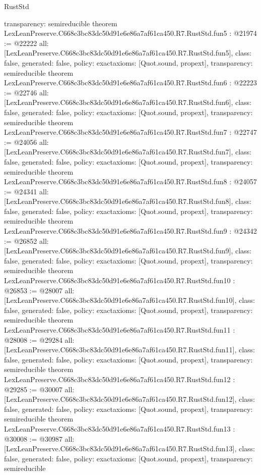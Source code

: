 \begin{lexlean}{RustStd}
\begin{coremodule}
{  transparency: semireducible
}
theorem LexLeanPreserve.C668c3bc83dc50d91e6e86a7af61ca450.R7.RustStd.fun5 : @21974 := @22222 {
  all: [LexLeanPreserve.C668c3bc83dc50d91e6e86a7af61ca450.R7.RustStd.fun5],
  class: false,
  generated: false,
  policy: exact{axioms: [Quot.sound, propext]},
  transparency: semireducible
}
theorem LexLeanPreserve.C668c3bc83dc50d91e6e86a7af61ca450.R7.RustStd.fun6 : @22223 := @22746 {
  all: [LexLeanPreserve.C668c3bc83dc50d91e6e86a7af61ca450.R7.RustStd.fun6],
  class: false,
  generated: false,
  policy: exact{axioms: [Quot.sound, propext]},
  transparency: semireducible
}
theorem LexLeanPreserve.C668c3bc83dc50d91e6e86a7af61ca450.R7.RustStd.fun7 : @22747 := @24056 {
  all: [LexLeanPreserve.C668c3bc83dc50d91e6e86a7af61ca450.R7.RustStd.fun7],
  class: false,
  generated: false,
  policy: exact{axioms: [Quot.sound, propext]},
  transparency: semireducible
}
theorem LexLeanPreserve.C668c3bc83dc50d91e6e86a7af61ca450.R7.RustStd.fun8 : @24057 := @24341 {
  all: [LexLeanPreserve.C668c3bc83dc50d91e6e86a7af61ca450.R7.RustStd.fun8],
  class: false,
  generated: false,
  policy: exact{axioms: [Quot.sound, propext]},
  transparency: semireducible
}
theorem LexLeanPreserve.C668c3bc83dc50d91e6e86a7af61ca450.R7.RustStd.fun9 : @24342 := @26852 {
  all: [LexLeanPreserve.C668c3bc83dc50d91e6e86a7af61ca450.R7.RustStd.fun9],
  class: false,
  generated: false,
  policy: exact{axioms: [Quot.sound, propext]},
  transparency: semireducible
}
theorem LexLeanPreserve.C668c3bc83dc50d91e6e86a7af61ca450.R7.RustStd.fun10 : @26853 := @28007 {
  all: [LexLeanPreserve.C668c3bc83dc50d91e6e86a7af61ca450.R7.RustStd.fun10],
  class: false,
  generated: false,
  policy: exact{axioms: [Quot.sound, propext]},
  transparency: semireducible
}
theorem LexLeanPreserve.C668c3bc83dc50d91e6e86a7af61ca450.R7.RustStd.fun11 : @28008 := @29284 {
  all: [LexLeanPreserve.C668c3bc83dc50d91e6e86a7af61ca450.R7.RustStd.fun11],
  class: false,
  generated: false,
  policy: exact{axioms: [Quot.sound, propext]},
  transparency: semireducible
}
theorem LexLeanPreserve.C668c3bc83dc50d91e6e86a7af61ca450.R7.RustStd.fun12 : @29285 := @30007 {
  all: [LexLeanPreserve.C668c3bc83dc50d91e6e86a7af61ca450.R7.RustStd.fun12],
  class: false,
  generated: false,
  policy: exact{axioms: [Quot.sound, propext]},
  transparency: semireducible
}
theorem LexLeanPreserve.C668c3bc83dc50d91e6e86a7af61ca450.R7.RustStd.fun13 : @30008 := @30987 {
  all: [LexLeanPreserve.C668c3bc83dc50d91e6e86a7af61ca450.R7.RustStd.fun13],
  class: false,
  generated: false,
  policy: exact{axioms: [Quot.sound, propext]},
  transparency: semireducible
}
\end{coremodule}
\end{lexlean}
